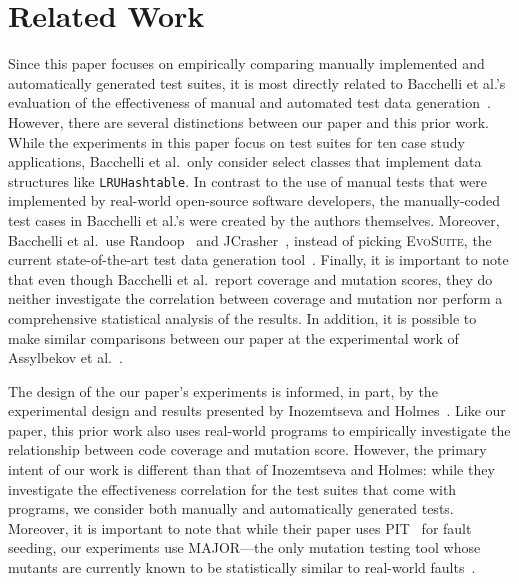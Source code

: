 
\section{Related Work} \label{sec:related_work}

Since this paper focuses on empirically comparing manually implemented and automatically generated test suites, it is
most directly related to Bacchelli et al.'s evaluation of the effectiveness of manual and automated test data
generation~\cite{bacchelli2008}. However, there are several distinctions between our paper and this prior work. While
the experiments in this paper focus on test suites for ten case study applications, Bacchelli et al.\ only consider
select classes that implement data structures like {\tt LRUHashtable}. In contrast to the use of manual tests that were
implemented by real-world open-source software developers, the manually-coded test cases in Bacchelli et al.'s were
created by the authors themselves.  Moreover, Bacchelli et al.\ use Randoop~\cite{pacheco2007feedback} and
JCrasher~\cite{csallner2004}, instead of picking \textsc{EvoSuite}, the current state-of-the-art test data generation
tool~\cite{fraser2013a}. Finally, it is important to note that even though Bacchelli et al.\ report coverage and
mutation scores, they do neither investigate the correlation between coverage and mutation nor perform a comprehensive
statistical analysis of the results. In addition, it is possible to make similar comparisons between our paper at the
experimental work of Assylbekov et al.~\cite{assylbekov2013}.

The design of the our paper's experiments is informed, in part, by the experimental design and results presented by
Inozemtseva and Holmes~\cite{inozemtseva2014}. Like our paper, this prior work also uses real-world programs to
empirically investigate the relationship between code coverage and mutation score. However, the primary intent of our
work is different than that of Inozemtseva and Holmes: while they investigate the effectiveness correlation for the test
suites that come with programs, we consider both manually and automatically generated tests. Moreover, it is important
to note that while their paper uses PIT~\cite{pit2014} for fault seeding, our experiments use MAJOR---the
only mutation testing tool whose mutants are currently known to be statistically similar to real-world
faults~\cite{just2014}.

